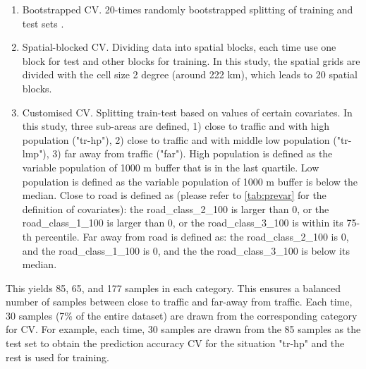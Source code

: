 \documentclass{article}
\begin{document}
\begin{enumerate}
\item Bootstrapped CV. 20-times randomly bootstrapped splitting of training and test sets \citep{luglobal}.  

\item Spatial-blocked CV. Dividing data into spatial blocks, each time use one block for test and other blocks for training. In this study, the spatial grids are divided with the cell size 2 degree (around 222 km), which leads to 20 spatial blocks.
    
\item Customised CV. Splitting train-test based on values of certain covariates. In this study, three sub-areas are defined, 1) close to traffic and with high population ("tr-hp"), 2) close to traffic and with middle low population ("tr-lmp"), 3) far away from traffic ("far"). High population is defined as the variable population of 1000 m buffer that is in the last quartile. Low population is defined as the variable population of 1000 m buffer is below the median. Close to road is defined as (please refer to \cref{tab:prevar} for the definition of covariates): 
the road\_class\_2\_100 is larger than 0, or the road\_class\_1\_100 is larger than 0, or the road\_class\_3\_100 is within its 75-th percentile.  
Far away from road is defined as:
the road\_class\_2\_100 is 0, and the
    road\_class\_1\_100 is 0, and the
    the road\_class\_3\_100 is below its median.  
    
     
\end{enumerate}
This yields 85, 65, and 177 samples in each category. This ensures a balanced number of samples between close to traffic and far-away from traffic. Each time, 30 samples (7\% of the entire dataset) are drawn from the corresponding category for CV. For example, each time, 30 samples are drawn from the 85 samples as the test set to obtain the prediction accuracy CV for the situation "tr-hp" and the rest is used for training.  
\end{document}
